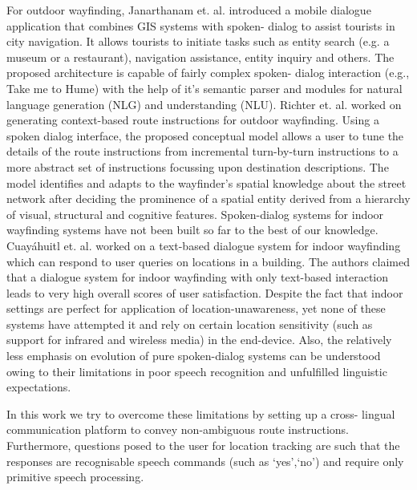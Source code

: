 \documentclass{iitkthesis}
\begin{document}
For outdoor wayfinding, Janarthanam et. al. \cite{janarthanam} introduced 
a mobile dialogue application that combines GIS systems with spoken-
dialog to assist tourists in city navigation. It allows 
tourists to initiate tasks such as entity search (e.g. a museum or a 
restaurant), navigation assistance, entity inquiry and others. The 
proposed architecture is capable of fairly complex spoken-
dialog interaction (e.g., Take me to Hume) with the help of it's semantic 
parser and  modules for natural language generation (NLG) and 
understanding (NLU). Richter et. al. \cite{richter} worked on generating 
context-based route instructions for outdoor wayfinding. Using a spoken 
dialog interface, the proposed conceptual model allows a user to tune the 
details of the route instructions from incremental turn-by-turn 
instructions to a more abstract set of instructions focussing upon 
destination descriptions. The model identifies and adapts to the wayfinder's 
spatial knowledge about the street network after deciding the prominence 
of a spatial entity derived from a hierarchy of visual, structural and 
cognitive features. Spoken-dialog systems for indoor wayfinding systems 
have not been built so far to the best of our knowledge. Cuay\'{a}huitl 
et. al.  \cite{heriberto} worked on a text-based dialogue system for indoor 
wayfinding which can respond to user queries on locations in a building. 
The authors claimed that a dialogue system for indoor wayfinding with 
only text-based interaction leads to very high overall scores of user 
satisfaction. Despite the fact that indoor settings are perfect for 
application of location-unawareness, yet none of these systems have  
attempted it and rely on certain location sensitivity (such as support 
for infrared and wireless media) in the end-device. Also, the relatively 
less emphasis on evolution of pure spoken-dialog systems can be 
understood owing to their limitations in poor speech recognition and 
unfulfilled linguistic expectations. 

In this work we try to overcome these limitations by setting up a cross-
lingual communication platform to convey non-ambiguous route instructions.
Furthermore, questions posed to the user for location tracking are 
such that the responses are recognisable speech commands 
(such as `yes',`no') and require only primitive speech processing. 
\end{document}
